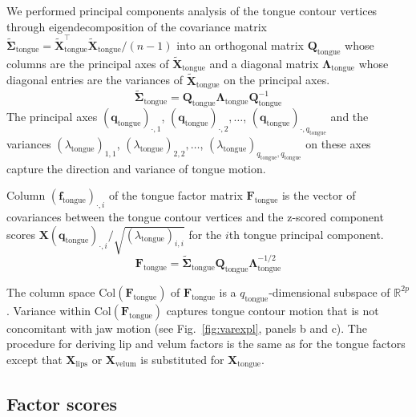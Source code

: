 \documentclass[reprint]{JASAnew}\usepackage[]{graphicx}\usepackage[]{color}
\begin{document}
We performed principal components analysis of the tongue contour vertices through eigendecomposition of the covariance matrix $\boldsymbol{\tilde{\Sigma}}_\text{tongue} = \mathbf{\tilde{X}}_\text{tongue}^\intercal \mathbf{\tilde{X}}_\text{tongue}/(n-1)$ into an orthogonal matrix $\mathbf{Q}_\text{tongue}$ whose columns are the principal axes of $\mathbf{\tilde{X}}_\text{tongue}$ and a diagonal matrix $\boldsymbol{\Lambda}_\text{tongue}$ whose diagonal entries are the variances of $\mathbf{\tilde{X}}_\text{tongue}$ on the principal axes.
% 
\begin{equation}
\boldsymbol{\tilde{\Sigma}}_\text{tongue} = \mathbf{Q}_\text{tongue} \boldsymbol{\Lambda}_\text{tongue} \mathbf{Q}_\text{tongue}^{-1}
\end{equation}
%
The principal axes $(\mathbf{q}_\text{tongue})_{\cdot,1}$, $(\mathbf{q}_\text{tongue})_{\cdot,2}, \ldots$, $(\mathbf{q}_\text{tongue})_{\cdot,q_\text{tongue}}$ and the variances $(\lambda_\text{tongue})_{1,1}$, $(\lambda_\text{tongue})_{2,2}, \ldots$, $(\lambda_\text{tongue})_{q_\text{tongue},q_\text{tongue}}$ on these axes capture the direction and variance of tongue motion.


Column $(\mathbf{f}_\text{tongue})_{\cdot,i}$ of the tongue factor matrix $\mathbf{F}_\text{tongue}$ is the vector of covariances between the tongue contour vertices and the z-scored component scores $\mathbf{X} (\mathbf{q}_\text{tongue})_{\cdot,i} / \sqrt{(\lambda_\text{tongue})_{i,i}}$ for the $i$th tongue principal component. 
%
\begin{equation}
\mathbf{F}_\text{tongue}
 = \boldsymbol{\tilde{\Sigma}}_\text{tongue} \mathbf{Q}_\text{tongue} \boldsymbol{\Lambda}_\text{tongue}^{-1/2}
\end{equation}


The column space $\mathrm{Col}(\mathbf{F}_\text{tongue})$ of $\mathbf{F}_\text{tongue}$ is a $q_\text{tongue}$-dimensional subspace of $\mathbb{R}^{2p}$. 
%
Variance within $\mathrm{Col}(\mathbf{F}_\text{tongue})$ captures tongue contour motion that is not concomitant with jaw motion (see Fig.~\ref{fig:varexpl}, panels b and c). 
%
The procedure for deriving lip and velum factors is the same as for the tongue factors except that $\mathbf{X}_\text{lips}$ or $\mathbf{X}_\text{velum}$ is substituted for $\mathbf{X}_\text{tongue}$.




\subsection{Factor scores}
\label{subsec:weights}
\end{document}
